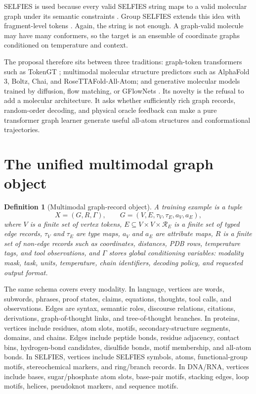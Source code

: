 \documentclass[11pt]{article}
\newtheorem{definition}{Definition}[section]
\newcommand{\1}{\mathbf{1}}
\begin{document}
SELFIES is used because every valid SELFIES string maps to a valid molecular graph under its semantic constraints \cite{KrennSELFIES2020}. Group SELFIES extends this idea with fragment-level tokens \cite{ChengGroupSELFIES2023}. Again, the string is not enough. A graph-valid molecule may have many conformers, so the target is an ensemble of coordinate graphs conditioned on temperature and context.

The proposal therefore sits between three traditions: graph-token transformers such as TokenGT \cite{KimTokenGT2022}; multimodal molecular structure predictors such as AlphaFold 3, Boltz, Chai, and RoseTTAFold-All-Atom; and generative molecular models trained by diffusion, flow matching, or GFlowNets \cite{GatDFM2024,LouSEDD2024,BengioGFlowFoundations2023,VolokhovaConfGFN2024}. Its novelty is the refusal to add a molecular architecture. It asks whether sufficiently rich graph records, random-order decoding, and physical oracle feedback can make a pure transformer graph learner generate useful all-atom structures and conformational trajectories.

\section{The unified multimodal graph object}

\begin{definition}[Multimodal graph-record object]
A training example is a tuple
\[
  X=(G,R,\Gamma),\qquad G=(V,E,\tau_V,\tau_E,a_V,a_E),
\]
where $V$ is a finite set of vertex tokens, $E\subseteq V\times V\times \mathcal R_E$ is a finite set of typed edge records, $\tau_V$ and $\tau_E$ are type maps, $a_V$ and $a_E$ are attribute maps, $R$ is a finite set of non-edge records such as coordinates, distances, PDB rows, temperature tags, and tool observations, and $\Gamma$ stores global conditioning variables: modality mask, task, units, temperature, chain identifiers, decoding policy, and requested output format.
\end{definition}

The same schema covers every modality. In language, vertices are words, subwords, phrases, proof states, claims, equations, thoughts, tool calls, and observations. Edges are syntax, semantic roles, discourse relations, citations, derivations, graph-of-thought links, and tree-of-thought branches. In proteins, vertices include residues, atom slots, motifs, secondary-structure segments, domains, and chains. Edges include peptide bonds, residue adjacency, contact bins, hydrogen-bond candidates, disulfide bonds, motif membership, and all-atom bonds. In SELFIES, vertices include SELFIES symbols, atoms, functional-group motifs, stereochemical markers, and ring/branch records. In DNA/RNA, vertices include bases, sugar/phosphate atom slots, base-pair motifs, stacking edges, loop motifs, helices, pseudoknot markers, and sequence motifs.
\end{document}
